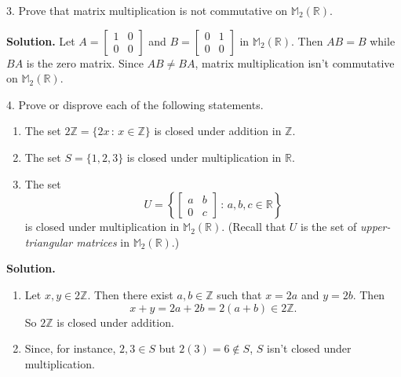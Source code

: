 \documentclass[10pt,]{book}
\theoremstyle{plain}
\theoremstyle{definition}
\theoremstyle{definition}
\theoremstyle{definition}
\theoremstyle{definition}
\numberwithin{equation}{section}
\def\Z{\mathbb{Z}}
\def\R{\mathbb{R}}
\def\M{\mathbb{M}}
\newcommand{\amp}{&}
\begin{document}
\begin{exerciselist}
\begin{enumerate}[label=(\alph*)]
\end{enumerate}
%
\item[3.]\hypertarget{exercise-9}{}Prove that matrix multiplication is not commutative on \(\M_2(\R)\).%
\par\smallskip
\par\smallskip
\noindent\textbf{Solution.}\hypertarget{solution-9}{}\quad
Let \(A=\begin{bmatrix}1 \amp 0 \\ 0 \amp 0\end{bmatrix}\) and \(B = \begin{bmatrix}0 \amp 1 \\ 0 \amp 0\end{bmatrix}\) in \(\M_2(\R)\). Then \(AB=B\) while \(BA\) is the zero matrix. Since \(AB\neq BA\), matrix multiplication isn't commutative on \(\M_2(\R)\).%
\item[4.]\hypertarget{exercise-10}{}Prove or disprove each of the following statements. \leavevmode%
\begin{enumerate}[label=(\alph*)]
\item\hypertarget{li-68}{}The set \(2\Z=\{2x\,:\,x\in \Z\}\) is closed under addition in \(\Z\).%
\item\hypertarget{li-69}{}The set \(S=\{1,2,3\}\) is closed under multiplication in \(\R\).%
\item\hypertarget{li-70}{}The set%
\begin{equation*}
U=\left\{
\begin{bmatrix}
a    \amp    b\\
0 \amp c \end{bmatrix}\,:\,a,b,c\in \R\right\}
\end{equation*}
is closed under multiplication in \(\M_2(\R)\). (Recall that \(U\) is  the set of \emph{upper-triangular matrices} in \(\M_2(\R)\).)%
\end{enumerate}
%
\par\smallskip
\par\smallskip
\noindent\textbf{Solution.}\hypertarget{solution-10}{}\quad
\leavevmode%
\begin{enumerate}[label=(\alph*)]
\item\hypertarget{li-71}{}Let \(x, y\in 2\Z\). Then there exist \(a,b\in \Z\) such that \(x=2a\) and \(y=2b\).  Then%
\begin{equation*}
x+y=2a+2b=2(a+b)\in 2\Z.
\end{equation*}
So \(2\Z\) is closed under addition.%
\item\hypertarget{li-72}{}Since, for instance, \(2,3\in S\) but \(2(3)=6\not\in S\), \(S\) isn't closed under multiplication.%

\end{enumerate}
\end{exerciselist}
\end{document}
